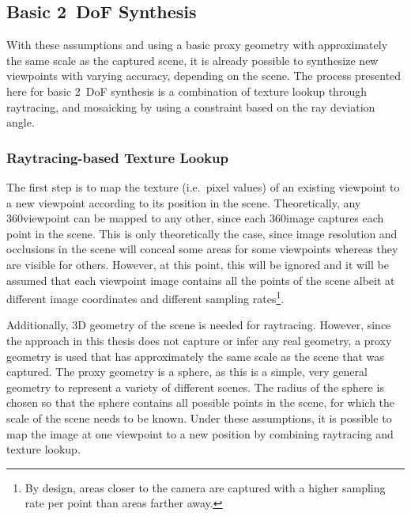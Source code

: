 \subsection{Basic 2~DoF Synthesis} \label{subsec:basic-synthesis}
With these assumptions and using a basic proxy geometry with approximately the same scale as the captured scene, it is already possible to synthesize new viewpoints with varying accuracy, depending on the scene. The process presented here for basic 2~DoF synthesis is a combination of texture lookup through raytracing, and mosaicking by using a constraint based on the ray deviation angle.

\subsubsection{Raytracing-based Texture Lookup}
The first step is to map the texture (i.e.\ pixel values) of an existing viewpoint to a new viewpoint according to its position in the scene. Theoretically, any 360\degree viewpoint can be mapped to any other, since each 360\degree image captures each point in the scene. This is only theoretically the case, since image resolution and occlusions in the scene will conceal some areas for some viewpoints whereas they are visible for others. However, at this point, this will be ignored and it will be assumed that each viewpoint image contains all the points of the scene albeit at different image coordinates and different sampling rates\footnote{By design, areas closer to the camera are captured with a higher sampling rate per point than areas farther away.}. 

Additionally, 3D geometry of the scene is needed for raytracing. However, since the approach in this thesis does not capture or infer any real geometry, a proxy geometry is used that has approximately the same scale as the scene that was captured. The proxy geometry is a sphere, as this is a simple, very general geometry to represent a variety of different scenes. The radius of the sphere is chosen so that the sphere contains all possible points in the scene, for which the scale of the scene needs to be known. Under these assumptions, it is possible to map the image at one viewpoint to a new position by combining raytracing and texture lookup.


